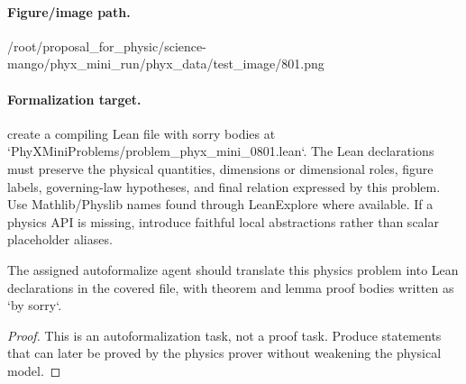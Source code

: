 \paragraph{Figure/image path.}
/root/proposal\_for\_physic/science-mango/phyx\_mini\_run/phyx\_data/test\_image/801.png

\paragraph{Formalization target.}
create a compiling Lean file with sorry bodies at `PhyXMiniProblems/problem\_phyx\_mini\_0801.lean`. The Lean declarations must preserve the physical quantities, dimensions or dimensional roles, figure labels, governing-law hypotheses, and final relation expressed by this problem.
Use Mathlib/Physlib names found through LeanExplore where available. If a physics API is missing, introduce faithful local abstractions rather than scalar placeholder aliases.

\begin{theorem}
\label{thm:physics:phyx_mini_0801:target}
The assigned autoformalize agent should translate this physics problem into Lean declarations in the covered file, with theorem and lemma proof bodies written as `by sorry`.
\end{theorem}
\begin{proof}
This is an autoformalization task, not a proof task. Produce statements that can later be proved by the physics prover without weakening the physical model.
\end{proof}

